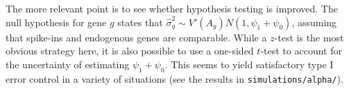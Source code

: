 \documentclass{article}
\begin{document}
The more relevant point is to see whether hypothesis testing is improved.
The null hypothesis for gene $g$ states that $\hat\sigma^2_g  \sim V'(A_g)N(1, \psi_1 + \psi_0)$, assuming that spike-ins and endogenous genes are comparable.
While a $z$-test is the most obvious strategy here, it is also possible to use a one-sided $t$-test to account for the uncertainty of estimating $\psi_1 + \psi_0$.
This seems to yield satisfactory type I error control in a variety of situations (see the results in \texttt{simulations/alpha/}).




\end{document}
